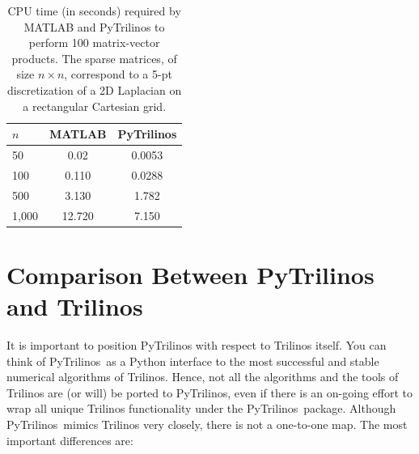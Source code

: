 \documentclass[acmtocl]{acmtrans2m}
\newcommand{\PyTrilinos}{{PyTrilinos}}
\begin{document}
\begin{table}
  \begin{center}
    \begin{tabular}{| l | c | c |}
      \hline
      $n$ & MATLAB & PyTrilinos \\
      \hline
      \hline
      50     & 0.02    & 0.0053   \\
      100    & 0.110   & 0.0288   \\
      500    & 3.130   & 1.782   \\
      1,000  & 12.720  & 7.150    \\
      \hline
    \end{tabular}
    \caption{CPU time (in seconds) required by MATLAB and PyTrilinos
      to perform 100 matrix-vector products. The sparse matrices, of size $n
        \times n$, correspond to a 5-pt discretization of a 2D Laplacian on a
        rectangular Cartesian grid.}
    \label{tab:matlab_matvec}
  \end{center}
\end{table}

\section{Comparison Between PyTrilinos and Trilinos}
\label{sec:comparison_trilinos}

It is important to position PyTrilinos with respect to Trilinos
itself. You can think of \PyTrilinos\ as a Python interface to the
most successful and stable numerical algorithms of Trilinos.  Hence,
not all the algorithms and the tools of Trilinos are (or will) be
ported to \PyTrilinos, even if there is an on-going effort to wrap all
unique Trilinos functionality under the \PyTrilinos\ package.
Although \PyTrilinos\ mimics Trilinos very closely, there is not a
one-to-one map. The most important differences are:
\end{document}
